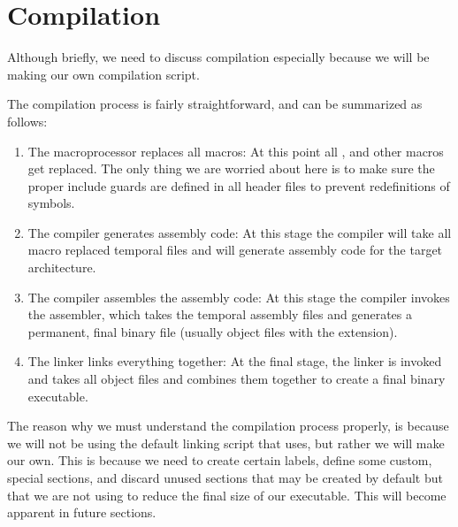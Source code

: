 \documentclass[12pt, svgnames]{book}
\begin{document}
\section{Compilation}

Although briefly, we need to discuss compilation especially because we will be making our own compilation script.

The compilation process is fairly straightforward, and can be summarized as follows:
\begin{enumerate}
	\item The macroprocessor replaces all macros:
	At this point all ,  and other macros get replaced. The only thing we are worried about here is to make sure the proper include guards are defined in all header files to prevent redefinitions of symbols.
	
	\item The compiler generates assembly code:
	At this stage the compiler will take all macro replaced temporal files and will generate assembly code for the target architecture.
	
	\item The compiler assembles the assembly code:
	At this stage the compiler invokes the assembler, which takes the temporal assembly files and generates a permanent, final binary file (usually object files with the  extension).
	
	\item The linker links everything together:
	At the final stage, the linker is invoked and takes all object files and combines them together to create a final binary executable.
\end{enumerate}

The reason why we must understand the compilation process properly, is because we will not be using the default linking script that  uses, but rather we will make our own. This is because we need to create certain labels, define some custom, special sections, and discard unused sections that may be created by default but that we are not using to reduce the final size of our executable. This will become apparent in future sections.
\end{document}
